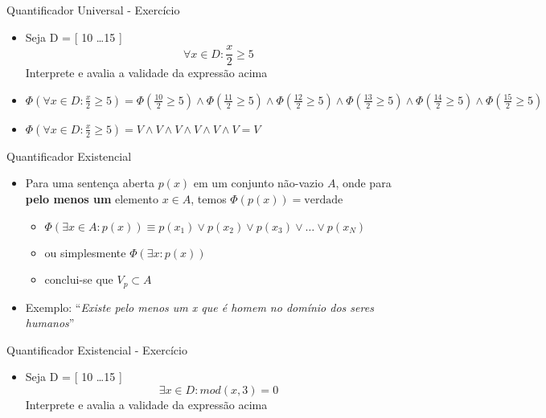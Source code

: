 \begin{frame}[t]{Quantificador Universal - Exercício}
	\begin{itemize} \itemsep 0.7cm
	\item Seja D = [ 10 \ldots 15 ] $$\forall x \in D: \frac{x}{2} \geq 5$$ Interprete e avalia a validade da expressão acima

	\item {\scriptsize $\Phi(\forall x \in D: \frac{x}{2} \geq 5) = \Phi(\frac{10}{2} \geq 5) \wedge \Phi(\frac{11}{2} \geq 5) \wedge \Phi(\frac{12}{2} \geq 5) \wedge \Phi(\frac{13}{2} \geq 5) \wedge \Phi(\frac{14}{2} \geq 5) \wedge \Phi(\frac{15}{2} \geq 5)$}

	\item $\Phi(\forall x \in D: \frac{x}{2} \geq 5) = V \wedge V \wedge V \wedge V \wedge V \wedge V  = V$
	\end{itemize}
\end{frame}

\begin{frame}[t]{Quantificador Existencial}
	\begin{itemize} \itemsep 0.8cm
	\item Para uma sentença aberta $p(x)$ em um conjunto não-vazio $A$, onde para {\bf pelo menos um} elemento $x \in A$, temos $\Phi(p(x)) = \mbox{verdade}$
	\begin{itemize}
	\item $\Phi(\exists x \in A: p(x)) \equiv p(x_1) \vee p(x_2) \vee p(x_3) \vee \ldots \vee p(x_N)$
	\item ou simplesmente $\Phi(\exists x: p(x))$
	\item conclui-se que $V_p \subset A$
	\end{itemize}

	\item Exemplo: ``{\it Existe pelo menos um x que é homem no domínio dos seres humanos}''
	\end{itemize}
\end{frame}

\begin{frame}[t]{Quantificador Existencial - Exercício}
	\begin{itemize}
	\item Seja D = [ 10 \ldots 15 ] $$\exists x \in D: mod(x,3) = 0$$ Interprete e avalia a validade da expressão acima
	\end{itemize}
\end{frame}

